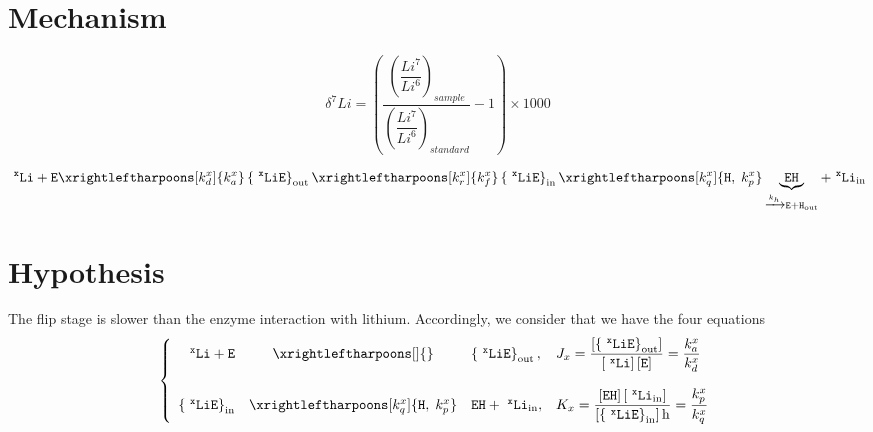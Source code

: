 \documentclass[aps,onecolumn,11pt]{revtex4}
\newcommand{\mychem}[1]{\mathtt{#1}}
\newcommand{\myconc}[1]{\left\lbrack{#1}\right\rbrack}
\newcommand{\spLi}[1]{{~^{\mychem{#1}}\mychem{Li}}}
\newcommand{\Li}[1]{\myconc{\spLi{#1}}}
\newcommand{\spEout}{\mychem{E}}
\newcommand{\Eout}{\myconc{\spEout}}
\newcommand{\spLiEin}[1]{\left\lbrace\spLi{#1}\spEout\right\rbrace_{\mathrm{in}}}
\newcommand{\LiEin}[1]{\myconc{\spLiEin{#1}}}
\newcommand{\spLiEout}[1]{\left\lbrace\spLi{#1}\spEout\right\rbrace_{\mathrm{out}}}
\newcommand{\LiEout}[1]{\myconc{\spLiEout{#1}}}
\newcommand{\spLiIn}[1]{{\spLi{#1}}_{\mathrm{in}}}
\newcommand{\LiIn}[1]{\myconc{\spLiIn{#1}}}
\newcommand{\spEHin}{\mychem{EH}}
\newcommand{\EHin}{\myconc{\spEHin}}
\newcommand{\proton}{\mathrm{h}}
\begin{document}
\section{Mechanism}
$$
	\delta^7Li = \left(
		\dfrac{\left(\dfrac{Li^7}{Li^6}\right)_{sample}}
		{\left(\dfrac{Li^7}{Li^6}\right)_{standard}}
		 -1 
	\right) \times 1000
$$


\begin{equation}
	 \spLi{x} +  \spEout  
	 \xrightleftharpoons[k_d^x]{k_a^x} 
	 \spLiEout{x}
	  \xrightleftharpoons[k_r^x]{k_f^x} 
	  \spLiEin{x} 
	  \xrightleftharpoons[k_q^x]{\mychem{H},\;k_p^x} \underbrace{\spEHin}_{\xrightarrow[]{k_h} \mychem{E} + \mychem{H}_{\mathrm{out}}} + \spLiIn{x}
\end{equation}

\section{Hypothesis}
The flip stage is slower than the enzyme interaction with lithium.
Accordingly, we consider that we have the four equations
\begin{equation}
	\left\lbrace
	\begin{array}{rcll}
	 \spLi{x} +  \spEout &  \xrightleftharpoons[]{} & \spLiEout{x}, & J_x = \dfrac{\LiEout{x}}{\Li{x} \Eout} = \dfrac{k_a^x}{k_d^x}\\
	 \\
	 \spLiEin{x} & \xrightleftharpoons[k_q^x]{\mychem{H},\;k_p^x} & {\spEHin}+ \spLiIn{x}, &K_x = \dfrac{\EHin \LiIn{x}}{\LiEin{x}\proton} = \dfrac{k_p^x}{k_q^x} \\
	\end{array}
	\right.
\end{equation}
\end{document}
